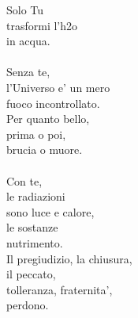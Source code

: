 \begin{haiku}
Solo Tu\\
trasformi l'h2o\\
in acqua.\\
\leavevmode\\
Senza te,\\
l'Universo e' un mero\\
fuoco incontrollato.\\
Per quanto bello,\\
prima o poi,\\
brucia o muore.\\
\leavevmode\\
Con te,\\
le radiazioni\\
sono luce e calore,\\
le sostanze\\
nutrimento.\\
Il pregiudizio, la chiusura,\\
    il peccato,\\
tolleranza, fraternita',\\
    perdono.\\
\end{haiku}

